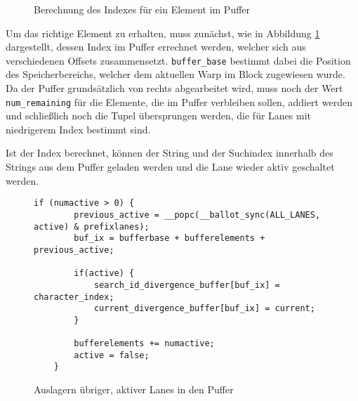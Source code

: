 \begin{figure}[]
	\caption{Berechnung des Indexes für ein Element im Puffer}
	\label{fig:buffer_index}
\end{figure}

Um das richtige Element zu erhalten, muss zunächst, wie in Abbildung \ref{fig:buffer_index} dargestellt, dessen Index im Puffer errechnet werden, welcher sich aus verschiedenen Offsets zusammensetzt.
\texttt{buffer\_base} bestimmt dabei die Position des Speicherbereichs, welcher dem aktuellen Warp im Block zugewiesen wurde.
Da der Puffer grundsätzlich von rechts abgearbeitet wird, muss noch der Wert \texttt{num\_remaining} für die Elemente, die im Puffer verbleiben sollen, addiert werden und schließlich noch die Tupel übersprungen werden, die für Lanes mit niedrigerem Index bestimmt sind.

Ist der Index berechnet, können der String und der Suchindex innerhalb des Strings aus dem Puffer geladen werden und die Lane wieder aktiv geschaltet werden.

\begin{figure}[]
	\begin{lstlisting}[language=MyC++]
	if (numactive > 0) {
		previous_active = __popc(__ballot_sync(ALL_LANES, active) & prefixlanes);
		buf_ix = bufferbase + bufferelements + previous_active;
		
		if(active) {
			search_id_divergence_buffer[buf_ix] = character_index;
			current_divergence_buffer[buf_ix] = current;
		}
		
		bufferelements += numactive;
		active = false;
	}
	\end{lstlisting}
	\caption{Auslagern übriger, aktiver Lanes in den Puffer}
	\label{flush_code}
\end{figure}

